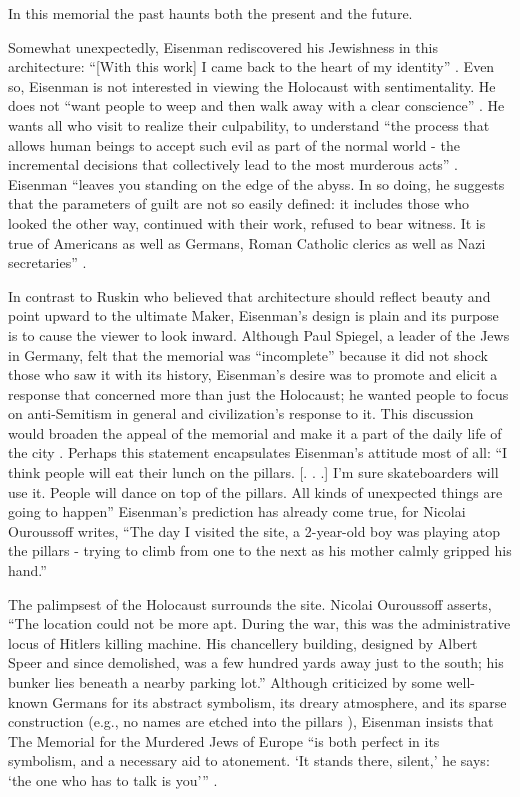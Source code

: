 In this memorial the past haunts both the present and the future.

Somewhat unexpectedly, Eisenman rediscovered his Jewishness in this
architecture: “[With this work] I came back to the heart of my
identity” \citep{quigley2005}.  Even so, Eisenman is not interested in
viewing the Holocaust with sentimentality.  He does not
``want people to weep and then walk
away with a clear conscience'' \citep{ouroussoff2005}.  He
wants all who visit to realize their culpability, to understand ``the
process that allows human beings to accept such evil as part of the
normal world - the incremental decisions that collectively lead to the
most murderous acts'' \citep{ouroussoff2005}. Eisenman “leaves you standing on the edge of the
abyss.  In so doing, he suggests that the parameters of guilt are not
so easily defined: it includes those who looked the other way,
continued with their work, refused to bear witness.  It is true of
Americans as well as Germans, Roman Catholic clerics as well as Nazi
secretaries” \citep{ouroussoff2005}. 

In contrast to Ruskin who believed that architecture should reflect
beauty and point upward to the ultimate Maker, Eisenman’s design is
plain and its purpose is to cause the viewer to look inward.  Although
Paul Spiegel, a leader of the Jews in Germany, felt that the memorial
was “incomplete” because it did not shock those who saw it with its
history, Eisenman’s desire was to promote and elicit a response that
concerned more than just the Holocaust; he wanted people to focus on
anti-Semitism in general and civilization’s response to it.  This
discussion would broaden the appeal of the memorial and make it a part
of the daily life of the city \citep{quigley2005}.  Perhaps this statement
encapsulates Eisenman’s attitude most of all:
“I think people will eat their lunch on
the pillars. [. . .] I’m sure skateboarders will use it.  People will
dance on top of the pillars.  All kinds of unexpected things are going
to happen” \citep{quigley2005}  Eisenman’s prediction has already come
true, for Nicolai Ouroussoff writes, “The day I visited the
site, a 2-year-old boy was playing atop the pillars - trying to climb
from one to the next as his mother calmly gripped his hand.” \citep{ouroussoff2005}

The palimpsest of the Holocaust surrounds the site.  Nicolai
Ouroussoff asserts, “The location could not be more
apt.  During the war, this was the administrative locus of
Hitler{\textquotesingle}s killing machine.  His chancellery building,
designed by Albert Speer and since demolished, was a
few hundred yards away just to the south; his bunker lies beneath a
nearby parking lot.” \citep{ouroussoff2005}  Although criticized by some well-known Germans
for its abstract symbolism, its dreary atmosphere, and its sparse
construction \citep{quigley2005} (e.g., no names are etched into the pillars
\citep{brunberg2012}), Eisenman insists that The Memorial for the Murdered Jews
of Europe “is both perfect in its symbolism, and a necessary aid to
atonement.  ‘It stands there, silent,’ he says: ‘the one who has to
talk is you’” \citep{quigley2005}.

